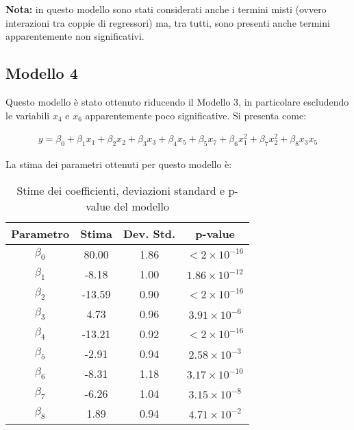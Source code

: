 \textbf{Nota:} in questo modello sono stati considerati anche i termini misti (ovvero interazioni tra coppie di regressori) ma, tra tutti, sono presenti anche termini apparentemente non significativi.

\subsection{Modello 4}
Questo modello è stato ottenuto riducendo il Modello 3, in particolare escludendo le variabili $x_4$ e $x_6$ apparentemente poco significative. Si presenta come:

\begin{align*}
	y = \beta_0 + \beta_1x_1 + \beta_2x_2 + \beta_3x_3 + \beta_4x_5 + \beta_5x_7 + \beta_6x_1^2 + \beta_7x_2^2 + \beta_8x_3x_5
\end{align*}


La stima dei parametri ottenuti per questo modello è:
\begin{table}[H]
	\centering
	\begin{tabular}{|c|c|c|c|}
		\hline
		\textbf{Parametro} & \textbf{Stima} & \textbf{Dev. Std.} & \textbf{p-value} \\
		\hline
		$\beta_0$  & 80.00   & 1.86  & \(< 2 \times 10^{-16}\) \\
		$\beta_1$  & -8.18   & 1.00  & \(1.86 \times 10^{-12}\) \\
		$\beta_2$  & -13.59  & 0.90  & \(< 2 \times 10^{-16}\) \\
		$\beta_3$  & 4.73    & 0.96  & \(3.91 \times 10^{-6}\) \\
		$\beta_4$  & -13.21  & 0.92  & \(< 2 \times 10^{-16}\) \\
		$\beta_5$  & -2.91   & 0.94  & \(2.58 \times 10^{-3}\) \\
		$\beta_6$  & -8.31   & 1.18  & \(3.17 \times 10^{-10}\) \\
		$\beta_7$  & -6.26   & 1.04  & \(3.15 \times 10^{-8}\) \\
		$\beta_8$  & 1.89    & 0.94  & \(4.71 \times 10^{-2}\) \\
		\hline
	\end{tabular}
	\caption{Stime dei coefficienti, deviazioni standard e p-value del modello}
	\label{tab:coef_model_final}
\end{table}


